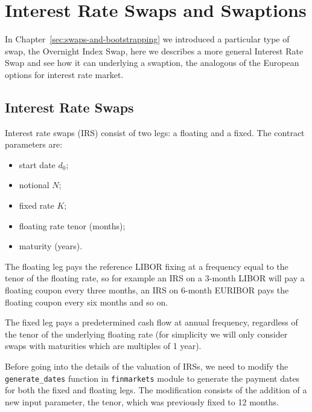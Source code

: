 \chapter{Interest Rate Swaps and Swaptions}
\label{interest-rate-swaps-and-swaptions}

In Chapter~\ref{sec:swaps-and-bootstrapping} we introduced a particular type of swap, the Overnight Index Swap, here we describes a more general Interest Rate Swap and see how it can underlying a swaption, the analogous of the European options for interest rate market.

\section{Interest Rate Swaps}\label{interest-rate-swaps}

Interest rate swaps (IRS) consist of two legs: a floating and a fixed. The
contract parameters are:

\begin{itemize}
\tightlist
\item
  start date \(d_0\);
\item
  notional \(N\);
\item
  fixed rate \(K\);
\item
  floating rate tenor (months);
\item
  maturity (years).
\end{itemize}

The floating leg pays the reference LIBOR fixing at a frequency equal to
the tenor of the floating rate, so for example an IRS on a 3-month
LIBOR will pay a floating coupon every three months, an IRS on 6-month
EURIBOR pays the floating coupon every six months and so on.

The fixed leg pays a predetermined cash flow at annual frequency,
regardless of the tenor of the underlying floating rate (for simplicity we will only consider swaps with maturities which are multiples of 1 year).

Before going into the details of the valuation of IRSs, we need to
modify the \texttt{generate\_dates} function in
\texttt{finmarkets} module to generate the payment dates for both the
fixed and floating legs. 
The modification consists of the addition of a new input
parameter, the tenor, which was previously fixed to 12 months.

